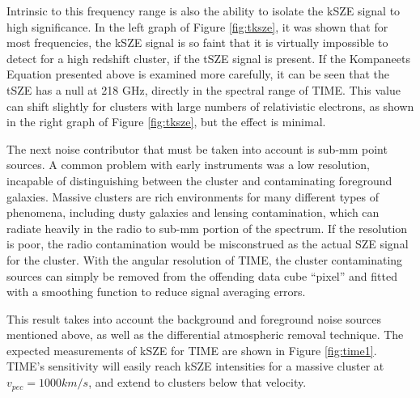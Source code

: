 \documentclass[manuscript]{aastex}
\begin{document}
Intrinsic to this frequency range is also the ability to isolate the kSZE signal to high significance. In the left graph of Figure \ref{fig:tksze}, it was shown that for most frequencies, the kSZE signal is so faint that it is virtually impossible to detect for a high redshift cluster, if the tSZE signal is present. If the Kompaneets Equation presented above is examined more carefully, it can be seen that the tSZE has a null at 218 GHz, directly in the spectral range of TIME. This value can shift slightly for clusters with large numbers of relativistic electrons, as shown in the right graph of Figure \ref{fig:tksze}, but the effect is minimal. 

The next noise contributor that must be taken into account is sub-mm point sources. A common problem with early instruments was a low resolution, incapable of distinguishing between the cluster and contaminating foreground galaxies. Massive clusters are rich environments for many different types of phenomena, including dusty galaxies and lensing contamination, which can radiate heavily in the radio to sub-mm portion of the spectrum. If the resolution is poor, the radio contamination would be misconstrued as the actual SZE signal for the cluster. With the angular resolution of TIME, the cluster contaminating sources can simply be removed from the offending data cube ``pixel'' and fitted with a smoothing function to reduce signal averaging errors. 

This result takes into account the background and foreground noise sources mentioned above, as well as the differential atmospheric removal technique. The expected measurements of kSZE for TIME are shown in Figure \ref{fig:time1}. TIME's sensitivity will easily reach kSZE intensities for a massive cluster at $v_{pec} = 1000 km/s$, and extend to clusters below that velocity.
\end{document}
